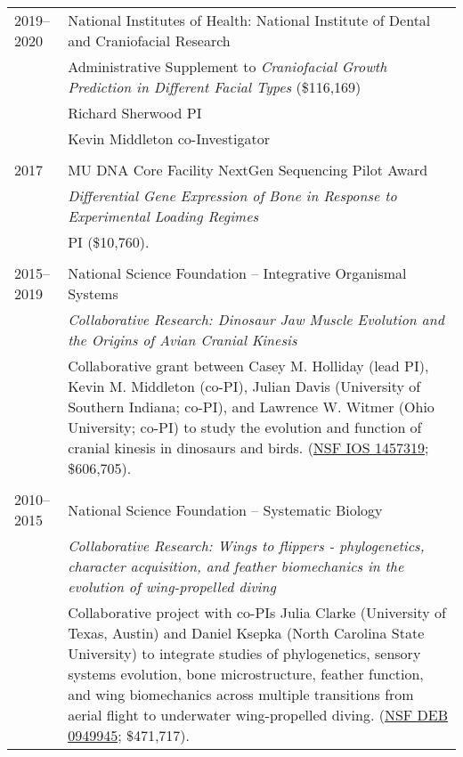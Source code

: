 \begin{longtable}{@{}lX@{}}
    2019--2020 & National Institutes of Health: National Institute of Dental and Craniofacial Research\\
    & Administrative Supplement to \emph{Craniofacial Growth Prediction in Different Facial Types} (\$116,169)\\
    & Richard Sherwood PI\\
    & Kevin Middleton co-Investigator\\
    \\
    2017 & MU DNA Core Facility NextGen Sequencing Pilot Award\\
    & \emph{Differential Gene Expression of Bone in Response to Experimental Loading Regimes}\\
    & PI (\$10,760).\\
    \\
    2015--2019 & National Science Foundation -- Integrative Organismal Systems\\
    & \emph{Collaborative Research: Dinosaur Jaw Muscle Evolution and the Origins of Avian Cranial Kinesis}\\[0.5pc]
    & Collaborative grant between Casey M. Holliday (lead PI), Kevin M. Middleton (co-PI), Julian Davis (University of Southern Indiana; co-PI), and Lawrence W. Witmer (Ohio University; co-PI) to study the evolution and function of cranial kinesis in dinosaurs and birds. (\href{https://www.nsf.gov/awardsearch/showAward?AWD_ID=1457319}{NSF IOS 1457319}; \$606,705).\\
    \\
    2010--2015 & National Science Foundation -- Systematic Biology\\
    & \textit{Collaborative Research: Wings to flippers - phylogenetics, character acquisition, and feather biomechanics in the evolution of wing-propelled diving}\\[0.5pc]
    & Collaborative project with co-PIs Julia Clarke (University of Texas, Austin) and Daniel Ksepka (North Carolina State University) to integrate studies of phylogenetics, sensory systems evolution, bone microstructure, feather function, and wing biomechanics across multiple transitions from aerial flight to underwater wing-propelled diving. (\href{http://www.nsf.gov/awardsearch/showAward.do?AwardNumber=0949945}{NSF DEB 0949945}; \$471,717).\\

\end{longtable}
